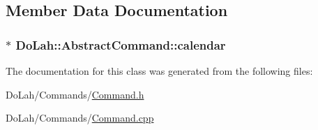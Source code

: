 \subsection{Member Data Documentation}
\hypertarget{class_do_lah_1_1_abstract_command_aa84442d22aaf6c9cf46c9133efb3088d}{}
\subsubsection[{calendar}]{$\ast$ Do\+Lah\+::\+Abstract\+Command\+::calendar\hspace{0.3cm}{\ttfamily [protected]}}\label{class_do_lah_1_1_abstract_command_aa84442d22aaf6c9cf46c9133efb3088d}


The documentation for this class was generated from the following files\+:\begin{DoxyCompactItemize}
\item 
Do\+Lah/\+Commands/\hyperlink{_command_8h}{Command.\+h}\item 
Do\+Lah/\+Commands/\hyperlink{_command_8cpp}{Command.\+cpp}\end{DoxyCompactItemize}
